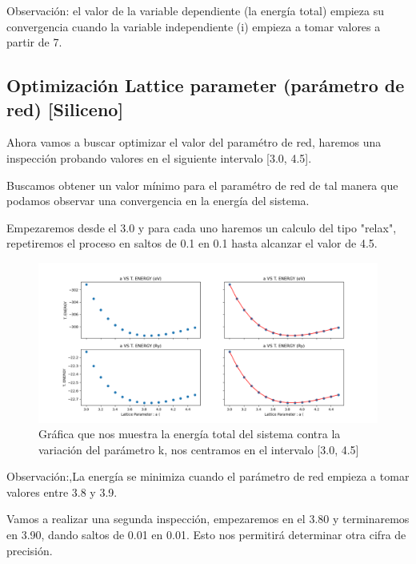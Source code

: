 Observación: el valor de la variable dependiente (la energía total) empieza su convergencia cuando 
la variable independiente (i) empieza a tomar valores a partir de 7.




\subsection{Optimización Lattice parameter (parámetro de red) [Siliceno]}

Ahora vamos a buscar optimizar el valor del paramétro de red, haremos una inspección probando valores
en el siguiente intervalo [3.0, 4.5].
 
\vspace{0.5cm}

Buscamos obtener un valor mínimo para el paramétro de red de tal manera que podamos observar una convergencia 
en la energía del sistema.

\vspace{0.5cm}

Empezaremos desde el 3.0 y para cada uno haremos un calculo del tipo "relax", repetiremos el proceso
en saltos de 0.1 en 0.1 hasta alcanzar el valor de 4.5.

\begin{figure}[H]
    \centering
    \includegraphics[scale=0.5]{images_siliceno/lattice_parameter_vs_T_energy.png}
    \caption{Gráfica que nos muestra la energía total del sistema contra la variación del parámetro k, nos centramos en el intervalo [3.0, 4.5]}
\end{figure}

Observación:,La energía se minimiza cuando el parámetro de red empieza a tomar valores entre 3.8 y 3.9.

\vspace{0.5cm}

Vamos a realizar una segunda inspección, empezaremos en el 3.80 y terminaremos en 3.90, dando saltos
de 0.01 en 0.01. Esto nos permitirá determinar otra cifra de precisión.

